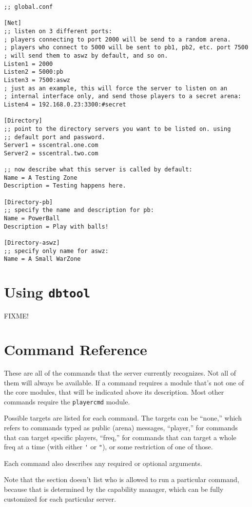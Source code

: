 \documentclass{article}
\begin{document}
\begin{verbatim}
;; global.conf

[Net]
;; listen on 3 different ports:
; players connecting to port 2000 will be send to a random arena.
; players who connect to 5000 will be sent to pb1, pb2, etc. port 7500
; will send them to aswz by default, and so on.
Listen1 = 2000
Listen2 = 5000:pb
Listen3 = 7500:aswz
; just as an example, this will force the server to listen on an
; internal interface only, and send those players to a secret arena:
Listen4 = 192.168.0.23:3300:#secret

[Directory]
;; point to the directory servers you want to be listed on. using
;; default port and password.
Server1 = sscentral.one.com
Server2 = sscentral.two.com

;; now describe what this server is called by default:
Name = A Testing Zone
Description = Testing happens here.

[Directory-pb]
;; specify the name and description for pb:
Name = PowerBall
Description = Play with balls!

[Directory-aswz]
;; specify only name for aswz:
Name = A Small WarZone
\end{verbatim}


\section{Using \texttt{dbtool}}

FIXME!


\section{Command Reference}

These are all of the commands that the server currently recognizes. Not
all of them will always be available. If a command requires a module
that's not one of the core modules, that will be indicated above its
description. Most other commands require the \texttt{playercmd} module.

Possible targets are listed for each command. The targets can be
``none,'' which refers to commands typed as public (arena) messages,
``player,'' for commands that can target specific players, ``freq,'' for
commands that can target a whole freq at a time (with either \verb/'/ or
\verb/"/), or some restriction of one of those.

Each command also describes any required or optional arguments.

Note that the section doesn't list who is allowed to run a particular
command, because that is determined by the capability manager, which can
be fully customized for each particular server.
\end{document}
